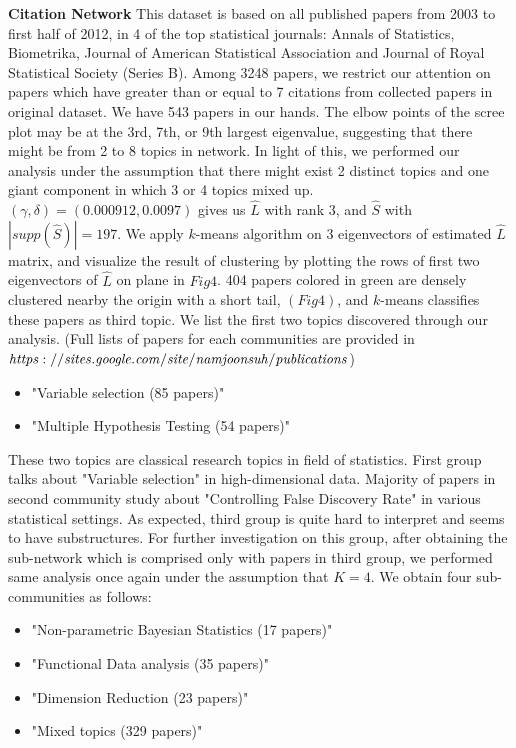\documentclass[AMS,STIX1COL]{WileyNJD-v2}
\begin{document}
\noindent\textbf{Citation Network} This dataset is based on all published papers from 2003 to first half of 2012, in 4 of the top statistical journals: Annals of Statistics, Biometrika, Journal of American Statistical Association and Journal of Royal Statistical Society (Series B). 
Among  3248 papers, we restrict our attention on papers which have greater than or equal to 7 citations from collected papers in original dataset. 
We have 543 papers in our hands. 
The elbow points of the scree plot may be at the 3rd, 7th, or 9th largest eigenvalue, suggesting that there might be from 2 to 8 topics in network. 
In light of this, we performed our analysis under the assumption that there might exist 2 distinct topics and one giant component in which 3 or 4 topics mixed up. \\

\noindent $(\gamma,\delta) = (0.000912,0.0097)$ gives us $\hat{L}$ with rank 3, and $\hat{S}$ with $|supp(\hat{S})|=197$. 
We apply $k$-means algorithm on 3 eigenvectors of estimated $\hat{L}$ matrix, and visualize the result of clustering by plotting the rows of first two eigenvectors of $\hat{L}$ on plane in $Fig 4$. 
404 papers colored in green are densely clustered nearby the origin with a short tail, $(Fig 4)$, and $k$-means classifies these papers as third topic. 
We list the first two topics discovered through our analysis. 
(Full lists of papers for each communities are provided in $\it https://sites.google.com/site/namjoonsuh/publications$)

\begin{itemize}
  \item "Variable selection (85 papers)"
  \item "Multiple Hypothesis Testing (54 papers)"
\end{itemize}

\noindent These two topics are classical research topics in field of statistics. 
First group talks about "Variable selection" in high-dimensional data. 
Majority of papers in second community study about "Controlling False Discovery Rate" in various statistical settings. 
As expected, third group is quite hard to interpret and seems to have substructures. 
For further investigation on this group, after obtaining the sub-network which is comprised only with papers in third group, we performed same analysis once again under the assumption that $K=4$. 
We obtain four sub-communities as follows:

\begin{itemize}
  \item "Non-parametric Bayesian Statistics (17 papers)"
  \item "Functional Data analysis (35 papers)"
  \item "Dimension Reduction (23 papers)"
  \item "Mixed topics (329 papers)"
\end{itemize}
\end{document}

